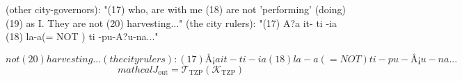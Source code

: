 
\begin{tzpsnapshot}
\end{tzpsnapshot}

(other city-governors): "(17) who, are with me (18) are not 'performing' (doing) (19) as I. They are not (20) harvesting..." (the city rulers): "(17) A?a it- ti -ia (18) la-a(= NOT ) ti -pu-A?u-na..."

\[
not (20) harvesting... (the city rulers): (17) Å¡a it- ti -ia (18) la-a(= NOT ) ti -pu-Å¡u-na...
\]
\[
mathcal{J}_{\mathrm{out}} = \mathcal{T}_{\mathrm{TZP}}\!\left(\mathcal{K}_{\mathrm{TZP}}\right)
\]

